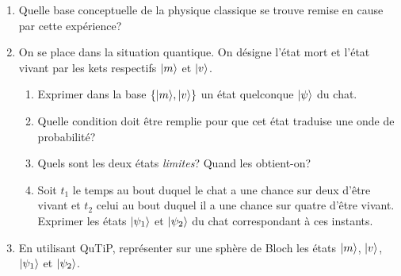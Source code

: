 \begin{enumerate}
\item Quelle base conceptuelle de la physique classique se trouve remise en
cause par cette expérience?

\item On se place dans la situation quantique. On désigne l'état mort et
l'état vivant par les kets respectifs $\vert m\rangle$ et $\vert v\rangle$.

\begin{enumerate}
\item Exprimer dans la base $\{\vert m\rangle,\vert v\rangle\} $ un état quelconque
$\vert\psi\rangle$ du chat.

\item Quelle condition doit être remplie pour que cet état traduise une onde
de probabilité?

\item Quels sont les deux états \emph{limites}? Quand les obtient-on?

\item Soit $t_1$ le temps au bout duquel le chat a une chance sur deux d'être
vivant et $t_2$ celui au bout duquel il a une chance sur quatre d'être vivant.
Exprimer les états $\vert\psi_1\rangle$ et $\vert\psi_2\rangle$ du chat correspondant à
ces instants.
\end{enumerate}
\item En utilisant QuTiP, représenter sur une sphère de Bloch les états 
$\vert m\rangle$, $\vert v\rangle$, $\vert\psi_1\rangle$ et $\vert\psi_2\rangle$.
\end{enumerate}

